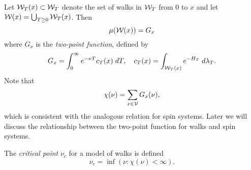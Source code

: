 Let $\mathcal{W}_T(x) \subset \mathcal{W}_T$ denote the set of walks in $\mathcal{W}_T$ from $0$ to $x$ and let $\mathcal{W}(x) = \bigcup_{T \ge 0} \mathcal{W}_T(x)$. Then
\begin{equation}
\mu(\mathcal{W}(x)) = G_x
\end{equation}
where $G_x$ is the \emph{two-point function}, defined by
\begin{equation}
G_x = \int_0^\infty e^{-\nu T} c_T(x) \; dT,
  \quad
c_T(x) = \int_{\mathcal{W}_T(x)} e^{-H_T} \; d\lambda_T.
\end{equation}
Note that
\begin{equation}
\chi(\nu) = \sum_{x\in\mathcal{V}} G_x(\nu),
\end{equation}
which is consistent with the analogous relation for spin systems. Later we will discuss the relationship between the two-point function for walks and spin systems.

The \emph{critical point} $\nu_c$ for a model of walks is defined
\begin{equation}
\nu_c = \inf (\nu : \chi(\nu) < \infty).
\end{equation}



